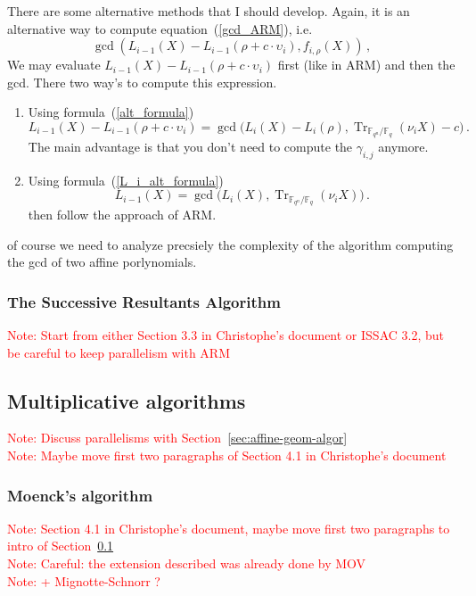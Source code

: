 \documentclass{article}
\newcommand{\ff}[1]{\mathbb{F}_{#1}}
\newcommand{\qq}{q}
\newcommand{\nn}{n}
\newcommand{\qn}{{\qq^\nn}}
\newcommand{\basef}{\ff{\qq}}
\newcommand{\extf}{\ff{\qn}}
\DeclareMathOperator{\Tr}{Tr}
\newcounter{algo}
\newcommand{\Notes}[1]{\textcolor{red}{Note: #1}}
\begin{document}
There are some alternative methods that I should develop. Again, it is an alternative way to compute equation~(\ref{gcd_ARM}), i.e.
$$\gcd(L_{i-1}(X)-L_{i-1}(\rho + c \cdot \upsilon_i),f_{i,\rho}(X)) \,,$$
We may evaluate $L_{i-1}(X)-L_{i-1}(\rho + c \cdot \upsilon_i)$ first (like in ARM) and then the gcd. There two way's to compute this expression.
\begin{enumerate}
\item Using formula~(\ref{alt_formula})
$$
L_{i-1}(X)-L_{i-1}(\rho +c \cdot \upsilon_i)=
\gcd\bigl(L_i(X)-L_i(\rho), \Tr_{\extf/\basef}(\nu_i X) -c  \bigr) \,.$$
The main advantage is that you don't need to compute the $\gamma_{i,j}$ anymore.
\item Using formula~(\ref{L_i_alt_formula})
$$ L_{i-1}(X)=\gcd\bigl(L_i(X),\Tr_{\extf/\basef}(\nu_i X )\bigr) \,.$$
 then follow the approach of ARM.
\end{enumerate}
of course we need to analyze precsiely the complexity of the algorithm computing the gcd of two affine porlynomials.


\subsubsection{The Successive Resultants Algorithm}
\label{sec:SRA}
\Notes{Start from either Section 3.3 in Christophe's document or ISSAC 3.2, but be careful to keep parallelism with ARM}












\subsection{Multiplicative algorithms}
\label{sec:mult-algor}
\Notes{Discuss parallelisms with Section~\ref{sec:affine-geom-algor}}\\
\noindent\Notes{Maybe move first two paragraphs of Section 4.1 in Christophe's document}

\subsubsection{Moenck's algorithm}
\label{sec:Moenck}
\Notes{Section 4.1 in Christophe's document, maybe move first two paragraphs to intro of Section~\ref{sec:mult-algor}}\\
\noindent \Notes{Careful: the extension described was already done by MOV}\\
\noindent\Notes{+ Mignotte-Schnorr ?}
\end{document}
